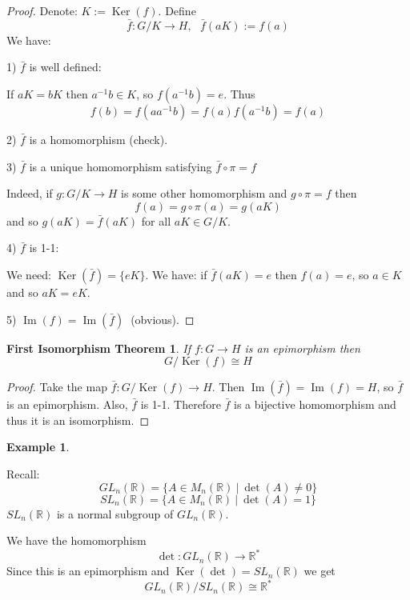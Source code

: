 \documentclass[12pt, letterpaper, oneside]{article}
\theoremstyle{plain}
\newtheorem{FIT}[theorem]{First Isomorphism Theorem}
\theoremstyle{definition}
\newtheorem{example}[theorem]{Example}
\newcommand{\R}{{\mathbb R}}
\renewcommand{\Im}{\operatorname{Im}}
\newcommand{\Ker}{\operatorname{Ker}}
\newcommand{\vs}{\vskip 5mm}
\begin{document}
\begin{proof}
Denote: $K:=\Ker(f)$. Define
$$\bar{f}\colon G/K \to H, \ \ \ \bar{f}(aK) := f(a)$$
We have:

1) $\bar{f}$ is well defined:

If $aK = bK$ then $a^{-1}b\in K$, so $f(a^{-1}b) = e$. Thus
$$f(b) = f(aa^{-1}b) = f(a)f(a^{-1}b) = f(a)$$

2) $\bar{f}$ is a homomorphism (check).


3) $\bar{f}$ is a unique homomorphism satisfying $\bar{f}\circ \pi = f$

Indeed, if $g\colon G/K \to H$ is some other homomorphism and $g\circ \pi = f$
then  
$$f(a) = g\circ \pi(a) = g(aK)$$ 
and so $g(aK) = \bar{f}(aK)$ for all $aK \in G/K$. 

4) $\bar{f}$ is 1-1:

We need: $\Ker(\bar{f}) = \{eK\}$. \newline
We have: if $\bar{f}(aK) = e$ then  $f(a) = e$, so $a\in K$ and so $aK = eK$. 

5) $\Im(f) = \Im(\bar{f})\ $ (obvious). 

\end{proof}


\vs

\begin{FIT}
\label{THM_FIT}
If $f\colon G\to H$ is an epimorphism then 
$$G/\Ker(f) \cong H$$
\end{FIT}

\begin{proof}
Take the map $\bar{f}\colon G/\Ker(f) \to H$. Then $\Im(\bar{f})= \Im(f) = H$, so $\bar{f}$ is 
an epimorphism. Also, $\bar{f}$ is 1-1. Therefore $\bar{f}$ is a bijective homomorphism 
and thus it is an isomorphism. 
\end{proof}


\vs

\begin{example} \ 

Recall:
$$GL_{n}(\R) = \{ A\in M_{n}(\R) \ |\ \det(A)\neq 0 \}$$
$$SL_{n}(\R) = \{ A\in M_{n}(\R) \ |\ \det(A) = 1 \}$$ 
$SL_{n}(\R)$ is a normal subgroup of $GL_{n}(\R)$. 

We have the homomorphism
$$\det \colon GL_{n}(\R) \to \R^{\ast}$$
Since this is an epimorphism and $\Ker(\det)= SL_{n}(\R)$ we get
$$GL_{n}(\R)/SL_{n}(\R)\cong \R^{\ast}$$

\end{example}

\vs 
\end{document}
